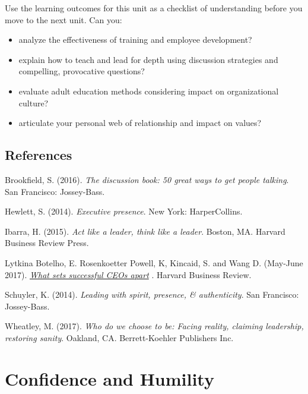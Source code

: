 \documentclass[
]{book}
\providecommand{\tightlist}{%
  \setlength{\itemsep}{0pt}\setlength{\parskip}{0pt}}
\begin{document}
\begin{progress}
Use the learning outcomes for this unit as a checklist of understanding
before you move to the next unit. Can you:

\begin{itemize}
\tightlist
\item
  analyze the effectiveness of training and employee development?\\
\item
  explain how to teach and lead for depth using discussion strategies
  and compelling, provocative questions?\\
\item
  evaluate adult education methods considering impact on organizational
  culture?\\
\item
  articulate your personal web of relationship and impact on values?
\end{itemize}
\end{progress}

\hypertarget{references-3}{%
\section*{References}\label{references-3}}

Brookfield, S. (2016). \emph{The discussion book: 50 great ways to get people talking}. San Francisco: Jossey-Bass.

Hewlett, S. (2014). \emph{Executive presence}. New York: HarperCollins.

Ibarra, H. (2015). \emph{Act like a leader, think like a leader}. Boston, MA. Harvard Business Review Press.

Lytkina Botelho, E. Rosenkoetter Powell, K, Kincaid, S. and Wang D. (May-June 2017). \href{https://hbr.org/2017/05/what-sets-successful-ceos-apart}{\emph{What sets successful CEOs apart}} . Harvard Business Review.

Schuyler, K. (2014). \emph{Leading with spirit, presence, \& authenticity}. San Francisco: Jossey-Bass.

Wheatley, M. (2017). \emph{Who do we choose to be: Facing reality, claiming leadership, restoring sanity}. Oakland, CA. Berrett-Koehler Publishers Inc.

\hypertarget{confidence-and-humility}{%
\chapter{Confidence and Humility}\label{confidence-and-humility}}
\end{document}
